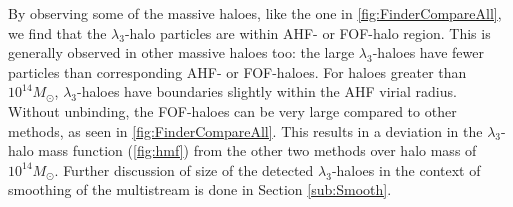 By observing some of the massive haloes, like the one in \autoref{fig:FinderCompareAll}, we find that the $\lambda_3$-halo particles are within AHF- or FOF-halo region. This is generally observed in other massive haloes too: the large $\lambda_3$-haloes have fewer particles than corresponding AHF- or FOF-haloes. For haloes greater than $10^{14} M_{\odot}$, $\lambda_3$-haloes have boundaries slightly within the AHF virial radius. Without unbinding, the FOF-haloes can be very large compared to other methods, as seen in \autoref{fig:FinderCompareAll}. This results in a deviation in the $\lambda_3$-halo mass function (\autoref{fig:hmf}) from the other two methods over halo mass of $10^{14} M_{\odot}$. Further discussion of size of the detected $\lambda_3$-haloes in the context of smoothing of the multistream is done in Section \ref{sub:Smooth}.   


